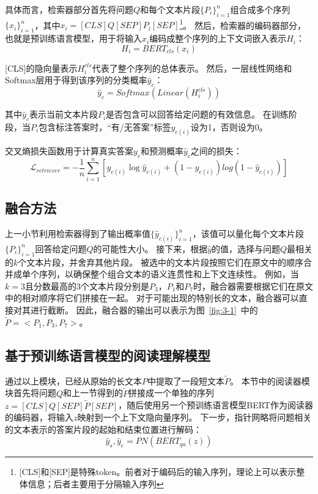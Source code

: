 具体而言，检索器部分首先将问题$Q$和每个文本片段$\{P_i\}^n_{i=1}$组合成多个序列$\{x_i\}^n_{i=1}$，其中$x_i=[CLS]Q[SEP]P_i[SEP]$\footnote{[CLS]和[SEP]是特殊token。前者对于编码后的输入序列，理论上可以表示整体信息；后者主要用于分隔输入序列}。
然后，检索器的编码器部分，也就是预训练语言模型，用于将输入$x_i$编码成整个序列的上下文词嵌入表示$H_i$：
\begin{equation}
    H_i = BERT_{cls}(x_i)
\end{equation}

[CLS]的隐向量表示$H^{cls}_i$代表了整个序列的总体表示。
然后，一层线性网络和Softmax层用于得到该序列的分类概率$\hat y_c$：
\begin{equation}
    \hat y_c=Softmax(Linear(H_i^{cls}))
\end{equation}

其中$\hat y_c$表示当前文本片段$P_i$是否包含可以回答给定问题的有效信息\cite{zhang2020retrospective}。
在训练阶段，当$P_i$包含标注答案时，“有/无答案”标签$y_{c(i)}$设为1，否则设为0。

交叉熵损失函数用于计算真实答案$y_c$和预测概率$\hat y_c$之间的损失：
\begin{equation}
    \mathcal  L_{retriever}  = -\frac{1}{n}\sum_{i=1}^{n}[y_{c(i)}\log\hat y_{c(i)}+(1-y_{c(i)})log(1-\hat y_{c(i)})]
\end{equation}

\subsection{融合方法}
上一小节利用检索器得到了输出概率值$\{\hat y_{c(i)}\}^n_{i=1}$，该值可以量化每个文本片段$\{P_i\}^n_{i=1}$回答给定问题$Q$的可能性大小。
接下来，根据$\hat y$的值，选择与问题$Q$最相关的$k$个文本片段，并舍弃其他片段。
被选中的文本片段按照它们在原文中的顺序合并成单个序列，以确保整个组合文本的语义连贯性和上下文连续性。
例如，当$k=3$且分数最高的3个文本片段分别是$P_3$，$P_1$和$P_7$时，融合器需要根据它们在原文中的相对顺序将它们拼接在一起。
对于可能出现的特别长的文本，融合器可以直接对其进行截断。
因此，融合器的输出可以表示为图~\ref{fig:3-1}~中的$\tilde P=<P_1,P_3,P_7>$。

\subsection{基于预训练语言模型的阅读理解模型}
通过以上模块，已经从原始的长文本$P$中提取了一段短文本$\tilde P$。
本节中的阅读器模块首先将问题$Q$和上一节得到的$\tilde P$拼接成一个单独的序列$z=[CLS]Q[SEP]\tilde P[SEP]$，随后使用另一个预训练语言模型BERT\cite{devlin2018bert}作为阅读器的编码器，将输入$z$映射到一个上下文隐向量序列。
下一步，指针网略将问题相关的文本表示的答案片段的起始和结束位置进行解码：
\begin{equation}
    \hat y_s,\hat y_e = PN(BERT_{qa}(z))
\end{equation}

